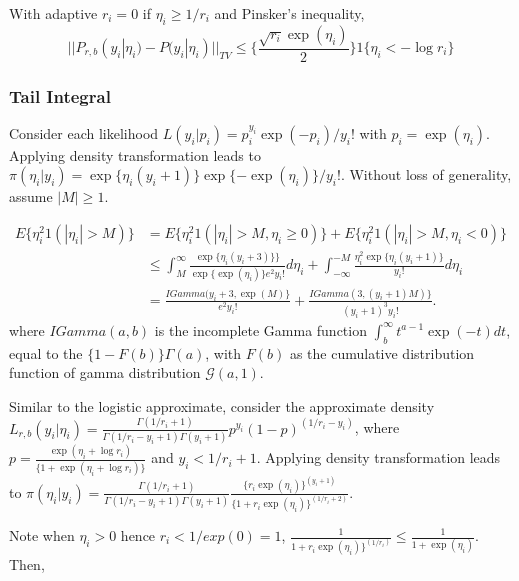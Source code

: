 \documentclass[10pt]{article}
\begin{document}
With adaptive $r_i = 0$ if $\eta_{i}\ge 1/r_i$ and Pinsker's inequality,
$$||P_{r,b}(y_i|\eta_{i}) - P(y_i|\eta_{i})||_{TV} \le   \{   \frac{\sqrt{r_{i}}  \exp(\eta_{i})}{2} \} 1 \{\eta_{i}< - \log r_{i} \}$$



\subsubsection{Tail Integral}


Consider each likelihood $L(y_i|p_i) = {p_i^{y_i}\exp(-p_i)}/{y_i!}$ with $p_i={\exp(\eta_{i})}$. Applying density transformation leads to 
$\pi(\eta_{i}|y_i) = \exp \{\eta_i (y_i+1)\} \exp\{-\exp(\eta_i) \} /{y_i!}$. Without loss of generality, assume $|M|\ge 1$.


\begin{equation}
	\begin{aligned}
			E\{ \eta_{i}^2 1(|\eta_{i}|>M) \} & = E\{ \eta_{i}^2 1(|\eta_{i}|>M, \eta_{i} \ge 0 ) \} + E\{ \eta_{i}^2 1(|\eta_{i}|>M, \eta_{i}<0 ) \} \\
	& \le \int_M^{\infty}  \frac{ \exp \{\eta_i (y_i+3)\}  \} }{\exp\{\exp(\eta_i)\} e^2 y_i!} d\eta_{i} + \int_{-\infty}^{-M}  \frac {\eta_{i}^2 \exp \{ \eta_{i} (y_i+1)\}  }{ y_i !}d\eta_{i}  \\
	& =  \frac{IGamma(y_i+3, \exp(M)\} }{e^2 y_i!} +   \frac{IGamma(3, (y_i+1)M)\} }{(y_i+1)^3 y_i!} .
	\end{aligned}
\end{equation}
where $IGamma(a,b)$ is the incomplete Gamma function $\int_b^{\infty} t^{a-1} \exp(-t) dt$, equal to the $\{1-F(b) \} \Gamma(a)$, with $F(b)$ as the cumulative distribution function of gamma distribution ${\mathcal G}(a,1)$.


Similar to the logistic approximate, consider the approximate density $L_{r,b} (y_i| \eta_i) =\frac{\Gamma(1/r_i+1)}{\Gamma(1/r_i-y_i+1)\Gamma(y_i+1)} p^{y_i} (1-p)^{(1/r_i-y_i)}$, where $p=\frac{\exp ( \eta_i+\log r_i)}{\{1+ \exp ( \eta_i +\log r_i)\}}$ and $y_i< 1/r_i+1$.  Applying density transformation leads to $\pi(\eta_{i}|y_i) = \frac{\Gamma(1/r_i+1)}{\Gamma(1/r_i-y_i+1)\Gamma(y_i+1)}\frac{\{r_i\exp(\eta_{i})\}^{(y_i+1)}}{\{1+r_i\exp(\eta_{i})\}^{(1/r_i+2)}}$.


Note when $\eta_i>0$ hence $r_i < 1/exp(0)=1$, $\frac{1}{1+r_i\exp(\eta_{i})\}^{(1/r_i)}}\le \frac{1}{1+ \exp(\eta_{i})} $. Then,
\end{document}
